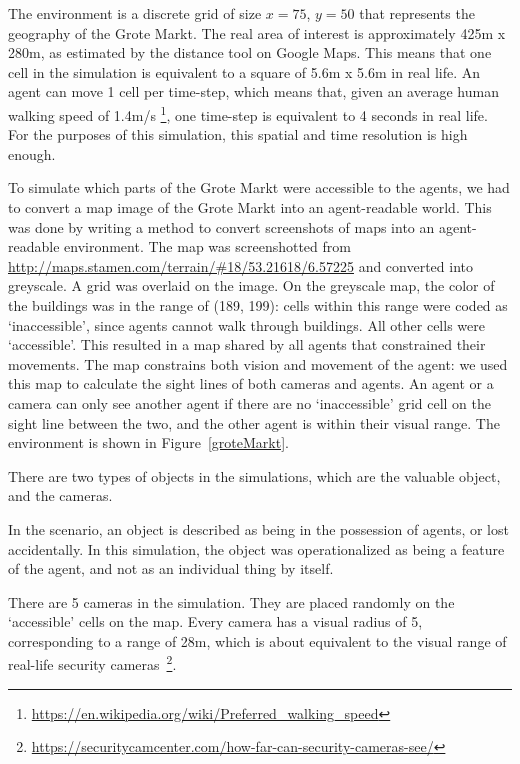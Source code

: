 \documentclass[12pt]{article}
\begin{document}
The environment is a discrete grid of size $x=75$, $y = 50$ that represents the geography of the Grote Markt. The real area of interest is approximately 425m x 280m, as estimated by the distance tool on Google Maps. This means that one cell in the simulation is equivalent to a square of 5.6m x 5.6m in real life. An agent can move 1 cell per time-step, which means that, given an average human walking speed of 1.4m/s \footnote{\url{https://en.wikipedia.org/wiki/Preferred_walking_speed}}, one time-step is equivalent to 4 seconds in real life. For the purposes of this simulation, this spatial and time resolution is high enough.

To simulate which parts of the Grote Markt were accessible to the agents, we had to convert a map image of the Grote Markt into an agent-readable world. This was done by writing a method to convert screenshots of maps into an agent-readable environment. The map was screenshotted from \url{http://maps.stamen.com/terrain/#18/53.21618/6.57225} and converted into greyscale. A grid was overlaid on the image. On the greyscale map, the color of the buildings was in the range of (189, 199): cells within this range were coded as `inaccessible', since agents cannot walk through buildings. All other cells were `accessible'. This resulted in a map shared by all agents that constrained their movements. The map constrains both vision and movement of the agent: we used this map to calculate the sight lines of both cameras and agents. An agent or a camera can only see another agent if there are no `inaccessible' grid cell on the sight line between the two, and the other agent is within their visual range. The environment is shown in Figure~\ref{groteMarkt}.
 

 There are two types of objects in the simulations, which are the valuable object, and the cameras. 

 In the scenario, an object is described as being in the possession of agents, or lost accidentally. In this simulation, the object was operationalized as being a feature of the agent, and not as an individual thing by itself.
 
 There are 5 cameras in the simulation. They are placed randomly on the `accessible' cells on the map. Every camera has a visual radius of 5, corresponding to a range of 28m, which is about equivalent to the visual range of real-life security cameras~\footnote{\url{https://securitycamcenter.com/how-far-can-security-cameras-see/}}.
 
\end{document}

